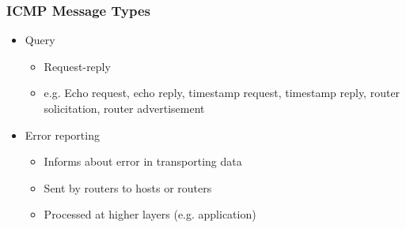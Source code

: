 \documentclass[a4paper]{article}
\begin{document}
\subsubsection{ICMP Message Types}
\begin{itemize}
	\item Query
	\begin{itemize}
		\item Request-reply
		\item e.g. Echo request, echo reply, timestamp request,
			timestamp reply, router solicitation, router
			advertisement
	\end{itemize}
	\item Error reporting
	\begin{itemize}
		\item Informs about error in transporting data
		\item Sent by routers to hosts or routers
		\item Processed at higher layers (e.g. application)
	\end{itemize}
\end{itemize}
\end{document}
